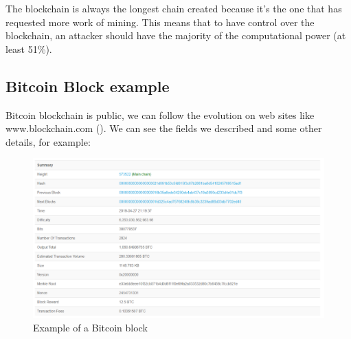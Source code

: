   The blockchain is always the longest chain created because it's the one that has requested more work of mining. This means that to have control over the blockchain, an attacker should have the majority of the computational power (at least 51\%).

    \subsection{Bitcoin Block example}

  Bitcoin blockchain is public, we can follow the evolution on web sites like www.blockchain.com (\cite{blockchain_web_site}). We can see the fields we described and some other details, for example: \newline

  \begin{figure}[h]
  \centering
  \includegraphics[width=15cm]{Figures/Block573522}
  \caption{Example of a Bitcoin block}
  \end{figure}
